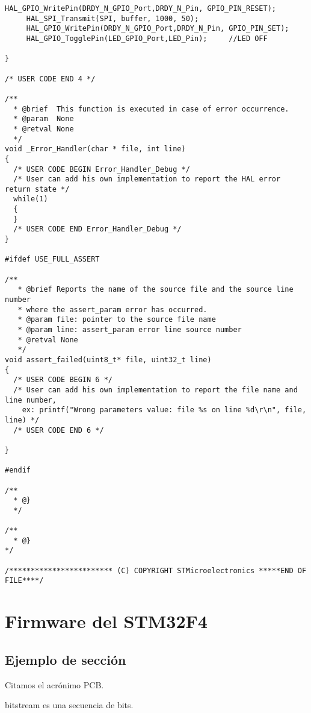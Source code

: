 \begin{lstlisting}[label=algoritmo:main.c,style = STM-code,frame=single,caption=main.c]
	 HAL_GPIO_WritePin(DRDY_N_GPIO_Port,DRDY_N_Pin, GPIO_PIN_RESET);
	 HAL_SPI_Transmit(SPI, buffer, 1000, 50);
	 HAL_GPIO_WritePin(DRDY_N_GPIO_Port,DRDY_N_Pin, GPIO_PIN_SET);
	 HAL_GPIO_TogglePin(LED_GPIO_Port,LED_Pin); 	//LED OFF

}

/* USER CODE END 4 */

/**
  * @brief  This function is executed in case of error occurrence.
  * @param  None
  * @retval None
  */
void _Error_Handler(char * file, int line)
{
  /* USER CODE BEGIN Error_Handler_Debug */
  /* User can add his own implementation to report the HAL error return state */
  while(1) 
  {
  }
  /* USER CODE END Error_Handler_Debug */ 
}

#ifdef USE_FULL_ASSERT

/**
   * @brief Reports the name of the source file and the source line number
   * where the assert_param error has occurred.
   * @param file: pointer to the source file name
   * @param line: assert_param error line source number
   * @retval None
   */
void assert_failed(uint8_t* file, uint32_t line)
{
  /* USER CODE BEGIN 6 */
  /* User can add his own implementation to report the file name and line number,
    ex: printf("Wrong parameters value: file %s on line %d\r\n", file, line) */
  /* USER CODE END 6 */

}

#endif

/**
  * @}
  */ 

/**
  * @}
*/ 

/************************ (C) COPYRIGHT STMicroelectronics *****END OF FILE****/

\end{lstlisting}
\chapter{Firmware del STM32F4\label{sec:Apendice_Code_STM}}

\section{Ejemplo de sección}

%
%


Citamos el acrónimo \gls{PCB}.

\Gls{bitstream} es una secuencia de bits.

